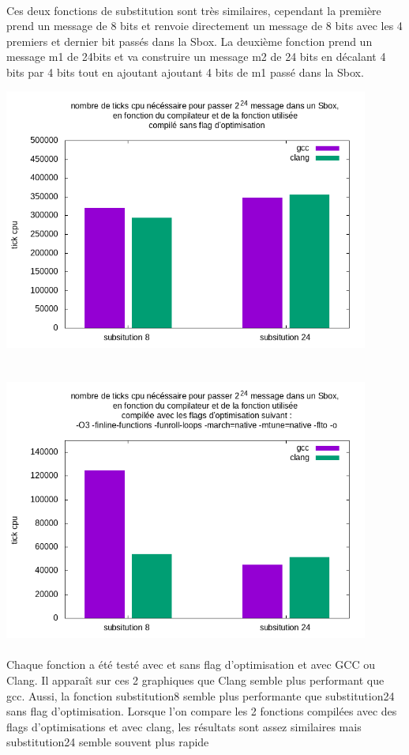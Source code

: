\documentclass{report}
\begin{document}
\paragraph{} Ces deux fonctions de substitution sont très similaires, 
cependant la première prend un message de 8 bits et renvoie directement un message de 8 bits avec les 4 premiers et dernier bit passés dans la Sbox.
La deuxième fonction prend un message m1 de 24bits et va construire un message m2 de 24 bits en décalant 4 bits par 4 bits tout en ajoutant ajoutant 4 bits de m1 passé dans la Sbox.

\includegraphics[width=12cm]{../src/benchmarks/substitution/img/substitution.png} \\ \\ \\
\includegraphics[width=12cm]{../src/benchmarks/substitution/img/substitution_opti.png}

\paragraph{} Chaque fonction a été testé avec et sans flag d'optimisation et avec GCC ou Clang. 
Il apparaît sur ces 2 graphiques que Clang semble plus performant que gcc. 
Aussi, la fonction substitution8 semble plus performante que substitution24  sans flag d'optimisation.
Lorsque l'on compare les 2 fonctions compilées avec des flags d'optimisations et avec clang, les résultats sont assez similaires mais substitution24 semble souvent plus rapide 
\end{document}
